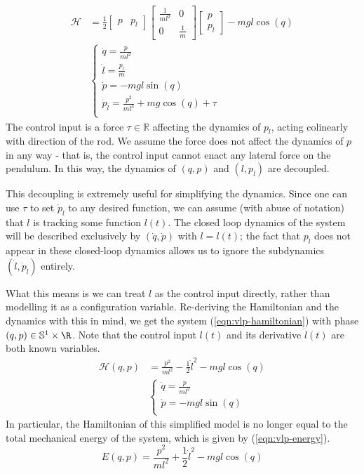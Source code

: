 \begin{align}\label{eqn:vlp-hamiltonian-with-pl}
   \mathcal{H} &= \frac{1}{2} \begin{bmatrix} p & p_l \end{bmatrix}
      \begin{bmatrix}
         \frac{1}{ml^2}  & 0 \\
         0 & \frac{1}{m}
      \end{bmatrix} \begin{bmatrix} p \\ p_l \end{bmatrix} - mgl\cos(q) \\
     &\begin{cases}
        \dot{q} = \frac{p}{ml^2} \\
        \dot{l} = \frac{p_l}{m} \\
        \dot{p} = -mgl\sin(q) \\
        \dot{p}_l = \frac{p^2}{ml^3} + mg\cos(q) + \tau \\
   \end{cases} \nonumber
\end{align}
The control input is a force \(\tau \in \mathbb{R}\) affecting the dynamics of
\(p_l\), acting colinearly with direction of the rod.
We assume the force does not affect the dynamics of \(p\) in any way -
that is, the control input cannot enact any lateral force on the pendulum.
In this way, the dynamics of \((q,p)\) and \((l,p_l)\) are decoupled. 

This decoupling is extremely useful for simplifying the dynamics. Since one can
use \(\tau\) to set \(\dot{p}_l\) to any desired function, we can assume (with abuse
of notation) that \(l\) is tracking some function \(l(t)\). 
The closed loop dynamics of the system will be described exclusively by
\((\dot{q},\dot{p})\) with \(l = l(t)\); 
the fact that \(p_l\) does not appear in these closed-loop dynamics allows us to
ignore the subdynamics \((\dot{l},\dot{p}_l)\) entirely.

What this means is we can treat \(l\) as the control input directly, rather than
modelling it as a configuration variable. Re-deriving the Hamiltonian and the
dynamics with this in mind, we get the system 
(\ref{eqn:vlp-hamiltonian}) with phase \((q,p) \in \mathbb{S}^1 \times \R\). 
Note that the control input \(l(t)\) and its derivative \(\dot{l}(t)\) are both
known variables.
\begin{align}\label{eqn:vlp-hamiltonian}
   \mathcal{H}(q,p) &= \frac{p^2}{ml^2} - \frac{1}{2}\dot{l}^2 - mgl\cos(q) \\
     &\begin{cases}
        \dot{q} = \frac{p}{ml^2} \\
        \dot{p} = -mgl\sin(q) \\
      \end{cases}\nonumber
\end{align}
In particular, the Hamiltonian of this simplified model is no longer equal to
the total mechanical energy of the system, which is given by
(\ref{eqn:vlp-energy}).
\begin{equation}\label{eqn:vlp-energy}
   E(q,p) = \frac{p^2}{ml^2} + \frac{1}{2}\dot{l}^2 - mgl\cos(q)
\end{equation}

